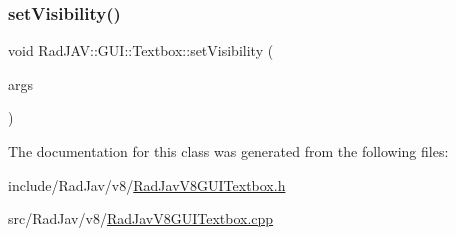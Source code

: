 \mbox{\label{class_rad_j_a_v_1_1_g_u_i_1_1_textbox_a868fdfdbb140aa47a4251579eb26d109}} 
\subsubsection{\texorpdfstring{set\+Visibility()}{setVisibility()}}
{\footnotesize\ttfamily void Rad\+J\+A\+V\+::\+G\+U\+I\+::\+Textbox\+::set\+Visibility (\begin{DoxyParamCaption}\item[{const v8\+::\+Function\+Callback\+Info$<$ v8\+::\+Value $>$ \&}]{args }\end{DoxyParamCaption})\hspace{0.3cm}{\ttfamily [static]}}



The documentation for this class was generated from the following files\+:\begin{DoxyCompactItemize}
\item 
include/\+Rad\+Jav/v8/\mbox{\hyperlink{_rad_jav_v8_g_u_i_textbox_8h}{Rad\+Jav\+V8\+G\+U\+I\+Textbox.\+h}}\item 
src/\+Rad\+Jav/v8/\mbox{\hyperlink{_rad_jav_v8_g_u_i_textbox_8cpp}{Rad\+Jav\+V8\+G\+U\+I\+Textbox.\+cpp}}\end{DoxyCompactItemize}
